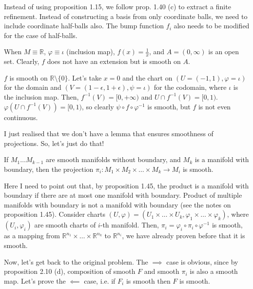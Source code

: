 \documentclass[a4paper]{article}
\begin{document}
\begin{note}[on ex. 2.24]
    Instead of using proposition 1.15, we follow prop. 1.40 (c) to extract a finite
    refinement. Instead of constructing a basis from only coordinate balls, we need
    to include coordinate half-balls also. The bump function $f_i$ also needs to be
    modified for the case of half-balls.
\end{note}

\begin{note}[on ex. 2.27]
    When $M \equiv \mathbb{R}$, $\varphi \equiv \iota$ (inclusion map),
    $f(x) = \frac{1}{x}$, and $A = (0, \infty)$ is an open set. Clearly, $f$ does
    not have an extension but is smooth on $A$.
\end{note}

\begin{exercise}[2-1]
    $f$ is smooth on $\mathbb{R} \setminus \{0\}$. Let's take $x=0$ and the chart
    on $(U=(-1,1),\varphi=\iota)$ for the domain and $(V=(1-\epsilon, 1+\epsilon), \psi=\iota)$ for
    the codomain, where $\iota$ is the inclusion map. Then, $f^{-1}(V) = [0, +\infty)$
    and $U \cap f^{-1}(V) = [0, 1)$. $\varphi(U \cap f^{-1}(V)) = [0,1)$, so
    clearly $\psi \circ f \circ \varphi^{-1}$ is smooth, but $f$ is not even
    continuous.
\end{exercise}

\begin{exercise}[2-2]
    I just realised that we don't have a lemma that ensures smoothness of projections.
    So, let's just do that!

    \begin{lemma}
        If $M_1 \dots M_{k-1} $ are smooth manifolds without boundary, and $M_k$ is a
        manifold with boundary, then the projection $\pi_i \colon M_1 \times M_2 \times \dots \times M_k \to M_i$
        is smooth.
    \end{lemma}
    \begin{prf}
        Here I need to point out that, by proposition 1.45, the product is a
        manifold with boundary if there are at most one manifold with boundary.
        Product of multiple manifolds with boundary is not a manifold with boundary
        (see the notes on proposition 1.45).
        Consider charts $(U, \varphi) = (U_1 \times \dots \times U_k, \varphi_1 \times \dots \times \varphi_k)$,
        where $(U_i, \varphi_i)$ are smooth charts of $i$-th manifold.
        Then, $\pi_i = \varphi_i \circ \pi_i \circ \varphi^{-1}$ is smooth, as a
        mapping from $\mathbb{R}^{n_1} \times \dots \times \mathbb{R}^{n_k}$ to $\mathbb{R}^{n_i} $,
        we have already proven before that it is smooth.
    \end{prf}

    Now, let's get back to the original problem. The $\implies $ case is obvious,
    since by proposition 2.10 (d), composition of smooth $F$ and smooth $\pi_i$
    is also a smooth map. Let's prove the $\impliedby$ case, i.e. if $F_i$ is 
    smooth then $F$ is smooth.
\end{exercise}
\end{document}
